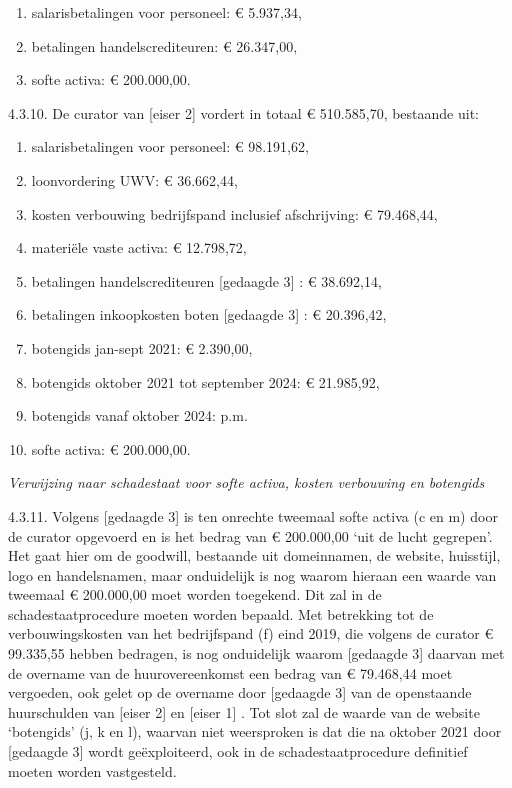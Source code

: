 \documentclass[
  dutch,
  a4paper,
]{article}
\begin{document}
\begin{enumerate}
\def\labelenumi{\alph{enumi}.}
\item
  salarisbetalingen voor personeel: € 5.937,34,
\item
  betalingen handelscrediteuren: € 26.347,00,
\item
  softe activa: € 200.000,00.
\end{enumerate}

4.3.10. De curator van {[}eiser 2{]} vordert in totaal € 510.585,70, bestaande uit:

\begin{enumerate}
\def\labelenumi{\alph{enumi}.}
\setcounter{enumi}{3}
\item
  salarisbetalingen voor personeel: € 98.191,62,
\item
  loonvordering UWV: € 36.662,44,
\item
  kosten verbouwing bedrijfspand inclusief afschrijving: € 79.468,44,
\item
  materiële vaste activa: € 12.798,72,
\item
  betalingen handelscrediteuren {[}gedaagde 3{]} : € 38.692,14,
\item
  betalingen inkoopkosten boten {[}gedaagde 3{]} : € 20.396,42,
\item
  botengids jan-sept 2021: € 2.390,00,
\item
  botengids oktober 2021 tot september 2024: € 21.985,92,
\item
  botengids vanaf oktober 2024: p.m.
\item
  softe activa: € 200.000,00.
\end{enumerate}

\emph{Verwijzing naar schadestaat voor softe activa, kosten verbouwing en botengids}

4.3.11. Volgens {[}gedaagde 3{]} is ten onrechte tweemaal softe activa (c en m) door de curator opgevoerd en is het bedrag van € 200.000,00 `uit de lucht gegrepen'. Het gaat hier om de goodwill, bestaande uit domeinnamen, de website, huisstijl, logo en handelsnamen, maar onduidelijk is nog waarom hieraan een waarde van tweemaal € 200.000,00 moet worden toegekend. Dit zal in de schadestaatprocedure moeten worden bepaald. Met betrekking tot de verbouwingskosten van het bedrijfspand (f) eind 2019, die volgens de curator € 99.335,55 hebben bedragen, is nog onduidelijk waarom {[}gedaagde 3{]} daarvan met de overname van de huurovereenkomst een bedrag van € 79.468,44 moet vergoeden, ook gelet op de overname door {[}gedaagde 3{]} van de openstaande huurschulden van {[}eiser 2{]} en {[}eiser 1{]} . Tot slot zal de waarde van de website `botengids' (j, k en l), waarvan niet weersproken is dat die na oktober 2021 door {[}gedaagde 3{]} wordt geëxploiteerd, ook in de schadestaatprocedure definitief moeten worden vastgesteld.
\end{document}
